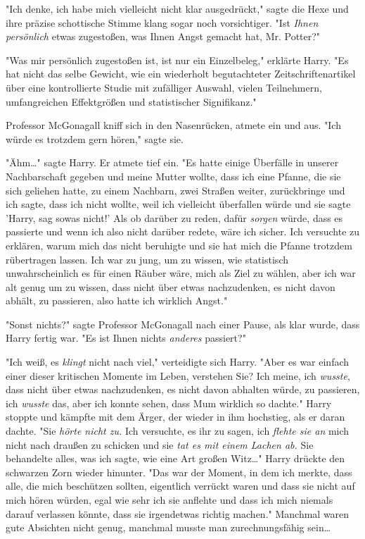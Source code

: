 {"Ich denke, ich habe mich vielleicht nicht klar ausgedrückt," sagte die Hexe und ihre präzise schottische Stimme klang sogar noch vorsichtiger. "Ist \emph{Ihnen persönlich} etwas zugestoßen, was Ihnen Angst gemacht hat, Mr. Potter?"

"Was mir persönlich zugestoßen ist, ist nur ein Einzelbeleg," erklärte Harry. "Es hat nicht das selbe Gewicht, wie ein wiederholt begutachteter Zeitschriftenartikel über eine kontrollierte Studie mit zufälliger Auswahl, vielen Teilnehmern, umfangreichen Effektgrößen und statistischer Signifikanz."

Professor McGonagall kniff sich in den Nasenrücken, atmete ein und aus. "Ich würde es trotzdem gern hören," sagte sie.

"Ähm…" sagte Harry. Er atmete tief ein. "Es hatte einige Überfälle in unserer Nachbarschaft gegeben und meine Mutter wollte, dass ich eine Pfanne, die sie sich geliehen hatte, zu einem Nachbarn, zwei Straßen weiter, zurückbringe und ich sagte, dass ich nicht wollte, weil ich vielleicht überfallen würde und sie sagte 'Harry, sag sowas nicht!' Als ob darüber zu reden, dafür \emph{sorgen} würde, dass es passierte und wenn ich also nicht darüber redete, wäre ich sicher. Ich versuchte zu erklären, warum mich das nicht beruhigte und sie hat mich die Pfanne trotzdem rübertragen lassen. Ich war zu jung, um zu wissen, wie statistisch unwahrscheinlich es für einen Räuber wäre, mich als Ziel zu wählen, aber ich war alt genug um zu wissen, dass nicht über etwas nachzudenken, es nicht davon abhält, zu passieren, also hatte ich wirklich Angst."

"Sonst nichts?" sagte Professor McGonagall nach einer Pause, als klar wurde, dass Harry fertig war. "Es ist Ihnen nichts \emph{anderes} passiert?"

"Ich weiß, es \emph{klingt} nicht nach viel," verteidigte sich Harry. "Aber es war einfach einer dieser kritischen Momente im Leben, verstehen Sie? Ich meine, ich \emph{wusste}, dass nicht über etwas nachzudenken, es nicht davon abhalten würde, zu passieren, ich \emph{wusste} das, aber ich konnte sehen, dass Mum wirklich so dachte." Harry stoppte und kämpfte mit dem Ärger, der wieder in ihm hochstieg, als er daran dachte. "Sie \emph{hörte nicht zu.} Ich versuchte, es ihr zu sagen, ich \emph{flehte sie an} mich nicht nach draußen zu schicken und sie \emph{tat es mit einem Lachen ab.} Sie behandelte alles, was ich sagte, wie eine Art großen Witz…" Harry drückte den schwarzen Zorn wieder hinunter. "Das war der Moment, in dem ich merkte, dass alle, die mich beschützen sollten, eigentlich verrückt waren und dass sie nicht auf mich hören würden, egal wie sehr ich sie anflehte und dass ich mich niemals darauf verlassen könnte, dass sie irgendetwas richtig machen." Manchmal waren gute Absichten nicht genug, manchmal musste man zurechnungsfähig sein…

}
